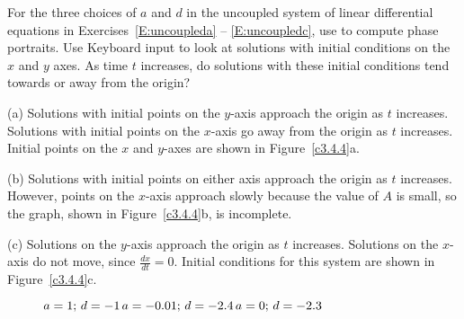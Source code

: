 \documentclass{ximera}
\begin{document}
\begin{computerExercise} \label{c3.4.4}
For the three choices of $a$ and $d$ in the uncoupled system of
linear differential equations in Exercises~\ref{E:uncoupleda} -- 
\ref{E:uncoupledc}, use {\pplane}
to compute phase portraits.  Use {\sf Keyboard input} to look at
solutions with initial conditions on the $x$ and $y$ axes.  As time
$t$ increases, do solutions with these initial conditions tend towards 
or away from the origin?

\begin{solution}

(a) Solutions with initial points on the $y$-axis approach the
origin as $t$ increases.  Solutions with initial points on the
$x$-axis go away from the origin as $t$ increases.  Initial points
on the $x$ and $y$-axes are shown in Figure~\ref{c3.4.4}a.

(b) Solutions with initial points on either axis approach the
origin as $t$ increases.  However, points on the $x$-axis
approach slowly because the value of $A$ is small, so the \Matlab
graph, shown in Figure~\ref{c3.4.4}b, is incomplete.

(c) Solutions on the $y$-axis approach the origin as $t$
increases.  Solutions on the $x$-axis do not move, since
$\frac{dx}{dt} = 0$.  Initial conditions for this system are shown
in Figure~\ref{c3.4.4}c.

\begin{figure}[htb]
                       \centerline{%
                       }
	\centerline{$a = 1\hbox{; }d = -1$\hspace{0.7in}$a = -0.01\hbox{; }d = -2.4$\hspace{0.7in}$a = 0\hbox{; }d = -2.3$}
\end{figure}

\end{solution}
\end{computerExercise}
\end{document}
